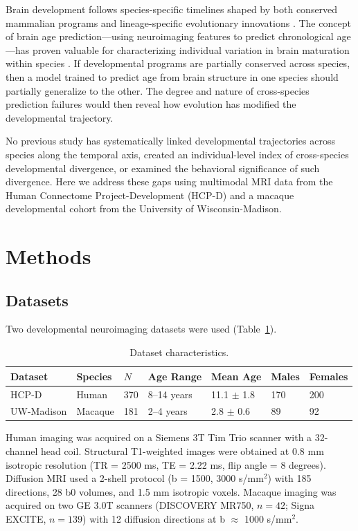 \documentclass[12pt]{article}
\begin{document}
Brain development follows species-specific timelines shaped by both conserved mammalian programs and lineage-specific evolutionary innovations \citep{sowell2003mapping}. The concept of brain age prediction---using neuroimaging features to predict chronological age---has proven valuable for characterizing individual variation in brain maturation within species \citep{franke2010estimating}. If developmental programs are partially conserved across species, then a model trained to predict age from brain structure in one species should partially generalize to the other. The degree and nature of cross-species prediction failures would then reveal how evolution has modified the developmental trajectory.

No previous study has systematically linked developmental trajectories across species along the temporal axis, created an individual-level index of cross-species developmental divergence, or examined the behavioral significance of such divergence. Here we address these gaps using multimodal MRI data from the Human Connectome Project-Development (HCP-D) \citep{somerville2018lifespan} and a macaque developmental cohort from the University of Wisconsin-Madison.

\section{Methods}

\subsection{Datasets}

Two developmental neuroimaging datasets were used (Table~\ref{tab:datasets}).

\begin{table}[H]
\centering
\caption{Dataset characteristics.}
\label{tab:datasets}
\begin{tabular}{lllllll}
\toprule
Dataset & Species & $N$ & Age Range & Mean Age & Males & Females \\
\midrule
HCP-D & Human & 370 & 8--14 years & 11.1 $\pm$ 1.8 & 170 & 200 \\
UW-Madison & Macaque & 181 & 2--4 years & 2.8 $\pm$ 0.6 & 89 & 92 \\
\bottomrule
\end{tabular}
\end{table}

Human imaging was acquired on a Siemens 3T Tim Trio scanner with a 32-channel head coil. Structural T1-weighted images were obtained at 0.8 mm isotropic resolution (TR = 2500 ms, TE = 2.22 ms, flip angle = 8 degrees). Diffusion MRI used a 2-shell protocol (b = 1500, 3000 s/mm$^2$) with 185 directions, 28 b0 volumes, and 1.5 mm isotropic voxels. Macaque imaging was acquired on two GE 3.0T scanners (DISCOVERY MR750, $n = 42$; Signa EXCITE, $n = 139$) with 12 diffusion directions at b $\approx$ 1000 s/mm$^2$.
\end{document}
